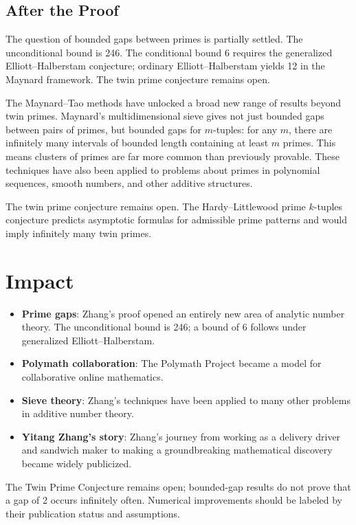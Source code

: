 \subsection{After the Proof}

The question of bounded gaps between primes is partially settled. The unconditional bound is 246. The conditional bound 6 requires the generalized Elliott--Halberstam conjecture; ordinary Elliott--Halberstam yields 12 in the Maynard framework. The twin prime conjecture remains open.

The Maynard--Tao methods have unlocked a broad new range of results beyond twin primes. Maynard's multidimensional sieve gives not just bounded gaps between pairs of primes, but bounded gaps for $m$-tuples: for any $m$, there are infinitely many intervals of bounded length containing at least $m$ primes. This means clusters of primes are far more common than previously provable. These techniques have also been applied to problems about primes in polynomial sequences, smooth numbers, and other additive structures.

The twin prime conjecture remains open. The Hardy--Littlewood prime $k$-tuples conjecture predicts asymptotic formulas for admissible prime patterns and would imply infinitely many twin primes.

\section{Impact}

\begin{itemize}
\item \textbf{Prime gaps}: Zhang's proof opened an entirely new area of analytic number theory. The unconditional bound is 246; a bound of 6 follows under generalized Elliott--Halberstam.
\item \textbf{Polymath collaboration}: The Polymath Project became a model for collaborative online mathematics.
\item \textbf{Sieve theory}: Zhang's techniques have been applied to many other problems in additive number theory.
\item \textbf{Yitang Zhang's story}: Zhang's journey from working as a delivery driver and sandwich maker to making a groundbreaking mathematical discovery became widely publicized.
\end{itemize}

\begin{highlightbox}
The Twin Prime Conjecture remains open; bounded-gap results do not prove that a gap of 2 occurs infinitely often. Numerical improvements should be labeled by their publication status and assumptions.
\end{highlightbox}

